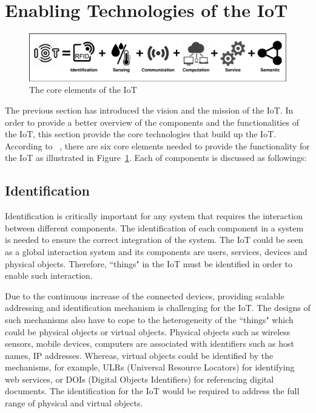 \newpage
\section{Enabling Technologies of the IoT}
\label{sec:technologies_of_iot}
 
\begin{figure}[ht!]
    \centering
    \includegraphics[scale=.75]{Pictures/c2/2-1-IoT-Elements.pdf}
    \caption{The core elements of the IoT~\citep{Al-Fuqaha:2015}}
    \label{fig:2.2-technologies}
\end{figure}

The previous section has introduced the vision and the mission of the IoT. 
In order to provide a better overview of the components and the functionalities of the IoT, this section provide the core technologies that build up the IoT. 
According to ~\cite{Al-Fuqaha:2015}, there are six core elements needed to provide the functionality for the IoT as illustrated in Figure~\ref{fig:2.2-technologies}.
Each of components is discussed as followings:


\subsection{Identification}
\label{subsec:identification}

Identification is critically important for any system that requires the interaction between different components. 
The identification of each component in a system is needed to ensure the correct integration of the system.
The IoT could be seen as a global interaction system and its components are users, services, devices and physical objects.
Therefore, ``things" in the IoT must be identified in order to enable such interaction.

Due to the continuous increase of the connected devices, providing scalable addressing and identification mechanism is challenging for the IoT. 
The designs of such mechanisms also have to cope to the heterogeneity of the ``things" which could be physical objects or virtual objects. 
Physical objects such as wireless sensors, mobile devices, computers are associated with identifiers such as host names, IP addresses.
Whereas, virtual objects could be identified by the mechanisms, for example, ULRs (Universal Resource Locators) for identifying web services, or DOIs (Digital Objects Identifiers) for referencing digital documents.
The identification for the IoT would be required to address the full range of physical and virtual objects.

